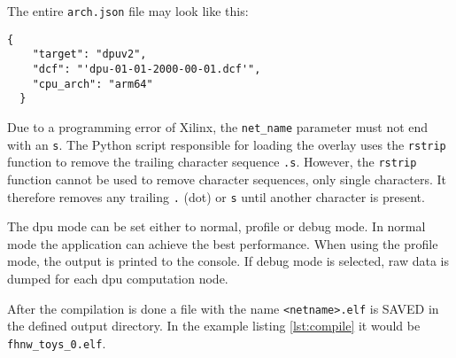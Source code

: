 The entire \texttt{arch.json} file may look like this:
\begin{lstlisting}[style=bash, caption={}, label=lst:arch_json]
  {
    "target": "dpuv2",
    "dcf": "'dpu-01-01-2000-00-01.dcf'",
    "cpu_arch": "arm64"
  }
\end{lstlisting}

Due to a programming error of Xilinx, the \texttt{net\_name} parameter must not end with an \texttt{s}.
The Python script responsible for loading the overlay uses the \texttt{rstrip} function to remove the trailing character sequence \texttt{.s}.
However, the \texttt{rstrip} function cannot be used to remove character sequences, only single characters.
It therefore removes any trailing \texttt{.} (dot) or \texttt{s} until another character is present.

The \acrshort{dpu} mode can be set either to normal, profile or debug mode.
In normal mode the application can achieve the best performance.
When using the profile mode, the output is printed to the console.
If debug mode is selected, raw data is dumped for each \acrshort{dpu} computation node.

After the compilation is done a file with the name \texttt{<netname>.elf} is SAVED in the defined output directory.
In the example listing \ref{lst:compile} it would be \texttt{fhnw\_toys\_0.elf}.
